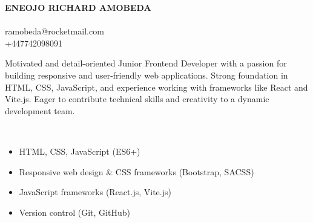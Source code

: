 \documentclass[12pt]{article}
\begin{document}
\pagestyle{empty}
\iffalse
\begin{center}
    {\huge\bfseries ENEOJO RICHARD AMOBEDA}\\
    \vspace{0.5cm}
    \textcolor{orange}{\faMapMarker} \fontfmt{5/3 71 Glenavon Road}\\
    \fontfmt{Glasgow, Lanarkshire, G20 0HR}\\[5pt]
    \textcolor{orange}{\faEnvelopeO} amobedarichard@gmail.com\\[5pt]
    \textcolor{orange}{\faPhone} +447742098091\\
\end{center}
\fi

\begin{center}
    {\huge\bfseries ENEOJO RICHARD AMOBEDA}\\
    \vspace{0.5cm}
    \textcolor{orange}{\faMapMarker} \\[5pt]
    \textcolor{orange}{\faEnvelopeO} ramobeda@rocketmail.com\\[5pt]
    \textcolor{orange}{\faPhone} +447742098091\\
\end{center}
\parbox{0.8\textwidth}{
Motivated and detail-oriented Junior Frontend Developer with a passion for building responsive and user-friendly web applications. Strong foundation in HTML, CSS, JavaScript, and experience working with frameworks like React and Vite.js. Eager to contribute technical skills and creativity to a dynamic development team.
}

\\[5pt]



\parbox{0.9\textwidth}{
\begin{itemize}
\item[\maltese] HTML, CSS, JavaScript (ES6+)
\item[\maltese] Responsive web design \& CSS frameworks (Bootstrap, SACSS)
\item[\maltese] JavaScript frameworks (React.js, Vite.js)
\item[\maltese] Version control (Git, GitHub)
\end{itemize}
}
\end{document}

